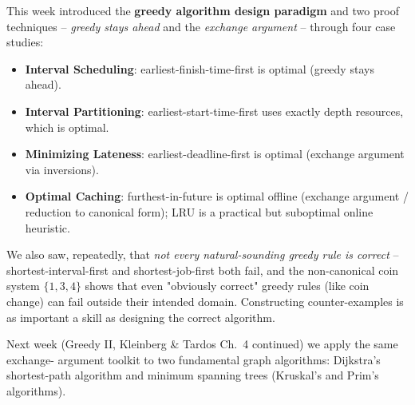 \documentclass[11pt]{article}
\begin{document}
This week introduced the \textbf{greedy algorithm design paradigm} and two proof
techniques -- \emph{greedy stays ahead} and the \emph{exchange argument} -- through four
case studies:

\begin{itemize}
    \item \textbf{Interval Scheduling}: earliest-finish-time-first is optimal (greedy
    stays ahead).
    \item \textbf{Interval Partitioning}: earliest-start-time-first uses exactly
    $\mathrm{depth}$ resources, which is optimal.
    \item \textbf{Minimizing Lateness}: earliest-deadline-first is optimal (exchange
    argument via inversions).
    \item \textbf{Optimal Caching}: furthest-in-future is optimal offline (exchange
    argument / reduction to canonical form); LRU is a practical but suboptimal online
    heuristic.
\end{itemize}

We also saw, repeatedly, that \emph{not every natural-sounding greedy rule is correct} --
shortest-interval-first and shortest-job-first both fail, and the non-canonical coin
system $\{1,3,4\}$ shows that even "obviously correct" greedy rules (like coin change) can
fail outside their intended domain. Constructing counter-examples is as important a skill
as designing the correct algorithm.

Next week (Greedy II, Kleinberg \& Tardos Ch.\ 4 continued) we apply the same exchange-
argument toolkit to two fundamental graph algorithms: Dijkstra's shortest-path algorithm
and minimum spanning trees (Kruskal's and Prim's algorithms).
\end{document}
